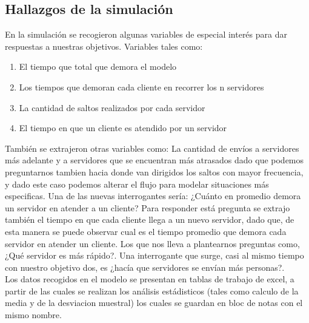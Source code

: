 \documentclass{article}
\begin{document}
\subsection{Hallazgos de la simulación}

En la simulación se recogieron algunas variables de especial interés para dar respuestas a nuestras objetivos. Variables tales como:
\begin{enumerate}
\item{El tiempo que total que demora el modelo}
\item{Los tiempos que demoran cada cliente en recorrer los n servidores}
\item{La cantidad de saltos realizados por cada servidor}
\item{El tiempo en que un cliente es atendido por un servidor}
\end{enumerate}
También se extrajeron otras variables como: La cantidad de envíos a servidores más adelante y a servidores que se encuentran más atrasados dado que podemos preguntarnos tambien hacia donde van dirigidos los saltos con mayor frecuencia, y dado este caso podemos alterar el flujo para modelar situaciones más especificas. Una de las nuevas interrogantes sería: ¿Cuánto en promedio demora un servidor en atender a un cliente? Para responder está pregunta se extrajo también el tiempo en que cada cliente llega a un nuevo servidor, dado que, de esta manera se puede observar cual es el tiempo promedio que demora cada servidor en atender un cliente. Los que nos lleva a plantearnos preguntas como, ¿Qué servidor es más rápido?. Una interrogante que surge, casi al mismo tiempo con nuestro objetivo dos, es ¿hacía que servidores se envían más personas?.\\
Los datos recogidos en el modelo se presentan en tablas de trabajo de excel, a partir de las cuales se realizan los análisis estádisticos (tales como calculo de la media y de la desviacion muestral) los cuales se guardan en bloc de notas con el mismo nombre.
\end{document}
